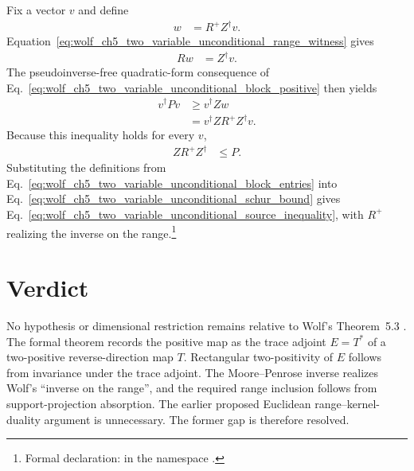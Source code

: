 \documentclass{article}
\begin{document}
Fix a vector $v$ and define
\begin{align}
    w&=R^+Z^\dagger v.
    \label{eq:wolf_ch5_two_variable_unconditional_quadratic_witness}
\end{align}
Equation~\ref{eq:wolf_ch5_two_variable_unconditional_range_witness} gives
\begin{align}
    Rw&=Z^\dagger v.
    \label{eq:wolf_ch5_two_variable_unconditional_witness_equation}
\end{align}
The pseudoinverse-free quadratic-form consequence of
Eq.~\ref{eq:wolf_ch5_two_variable_unconditional_block_positive} then yields
\begin{align}
    v^\dagger Pv
        &\geq v^\dagger Zw
    \label{eq:wolf_ch5_two_variable_unconditional_quadratic_bound_first}\\
        &=v^\dagger ZR^+Z^\dagger v.
    \label{eq:wolf_ch5_two_variable_unconditional_quadratic_bound_second}
\end{align}
Because this inequality holds for every $v$,
\begin{align}
    ZR^+Z^\dagger&\leq P.
    \label{eq:wolf_ch5_two_variable_unconditional_schur_bound}
\end{align}
Substituting the definitions from
Eq.~\ref{eq:wolf_ch5_two_variable_unconditional_block_entries} into
Eq.~\ref{eq:wolf_ch5_two_variable_unconditional_schur_bound} gives
Eq.~\ref{eq:wolf_ch5_two_variable_unconditional_source_inequality}, with
$R^+$ realizing the inverse on the range.\footnote{Formal declaration:
 in the namespace
.}

\section{Verdict}

No hypothesis or dimensional restriction remains relative to Wolf's
Theorem~5.3 \cite[Chapter~5, Theorem~5.3]{Wolf2012Quantum}. The formal theorem
records the positive map as the trace adjoint $E=T^*$ of a two-positive
reverse-direction map $T$. Rectangular two-positivity of $E$ follows from
invariance under the trace adjoint. The Moore--Penrose inverse realizes Wolf's
``inverse on the range'', and the required range inclusion follows from
support-projection absorption. The earlier proposed Euclidean
range--kernel-duality argument is unnecessary. The former gap is therefore
resolved.



\end{document}
